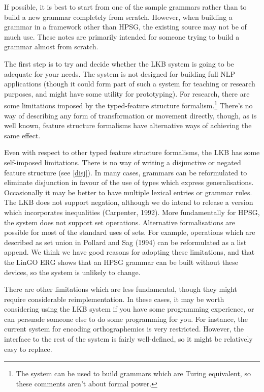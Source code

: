 \documentclass[12pt]{report}
\begin{document}
If possible, it is best to start from one of the sample grammars
rather than to build a new grammar completely from scratch.
However, when building a grammar in a framework other than 
HPSG, the existing source may not be of much use.
These notes are primarily intended for someone
trying to build a grammar almost from scratch.

The first step is to try and decide whether the LKB system is
going to be adequate for your needs.  The system is not designed for
building full NLP applications (though it could form part of such a 
system for teaching or research purposes, and might have some
utility for prototyping).  
For research, there are some
limitations imposed by the typed-feature structure 
formalism.\footnote{The system can be used to 
build grammars which are Turing equivalent, so 
these comments aren't about formal power.}
There's no way of describing any form of transformation
or movement directly, though, as is well known, feature structure
formalisms have alternative ways of achieving the same effect.

Even with respect to other typed feature structure formalisms,
the LKB has some self-imposed limitations.  There is
no way of writing a disjunctive or negated
feature structure (see \ref{disj}).
In many cases, grammars can be reformulated to eliminate disjunction
in favour of the use of types which express generalisations.
Occasionally it may be better to have multiple lexical entries
or grammar rules.  
The LKB does not support negation,
although we do intend to release a version which incorporates inequalities
(Carpenter, 1992).  More fundamentally for HPSG, the system
does not support set operations.  Alternative formalisations are
possible for most of the standard uses of sets.  For example,
operations which are described as set union in Pollard and Sag (1994)
can be reformulated as a list append.  We think we have good reasons
for adopting these limitations, and that the LinGO ERG
shows that an HPSG grammar can be built without these devices,
so the system is unlikely to change.

There are other limitations which are less fundamental,
though they might require considerable reimplementation.
In these cases, it may be worth considering using the LKB system if
you have some programming experience, or can persuade
someone else to do some programming for you.  For instance,
the current system for encoding orthographemics is very restricted.  
However, the interface to the rest of the system is fairly well-defined,
so it might be relatively easy to replace.  
\end{document}
